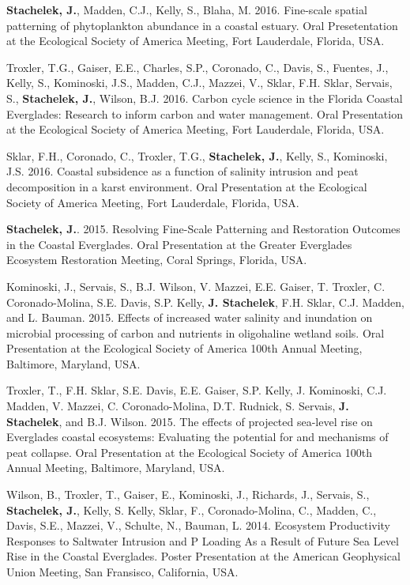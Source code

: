 \documentclass[11pt]{article}
\begin{document}
\begin{bibenum}
  \item \textbf{Stachelek, J.}, Madden, C.J., Kelly, S., Blaha, M. 2016. Fine-scale spatial patterning of phytoplankton abundance in a coastal estuary. Oral Presetentation at the Ecological Society of America Meeting, Fort Lauderdale, Florida, USA. %
% 
    \item Troxler, T.G., Gaiser, E.E., Charles, S.P., Coronado, C., Davis, S., Fuentes, J., Kelly, S., Kominoski, J.S., Madden, C.J., Mazzei, V., Sklar, F.H. Sklar, Servais, S., \textbf{Stachelek, J.}, Wilson, B.J. 2016. Carbon cycle science in the Florida Coastal Everglades: Research to inform carbon and water management. Oral Presentation at the Ecological Society of America Meeting, Fort Lauderdale, Florida, USA.
%   
    \item Sklar, F.H., Coronado, C., Troxler, T.G., \textbf{Stachelek, J.}, Kelly, S., Kominoski, J.S. 2016. Coastal subsidence as a function of salinity intrusion and peat decomposition in a karst environment. Oral Presentation at the Ecological Society of America Meeting, Fort Lauderdale, Florida, USA.
%   
    \item \textbf{Stachelek, J.}. 2015. Resolving Fine-Scale Patterning and Restoration Outcomes in the Coastal Everglades. Oral Presentation at the Greater Everglades Ecosystem Restoration Meeting, Coral Springs, Florida, USA. %
%   
    \item Kominoski, J., Servais, S., B.J. Wilson, V. Mazzei, E.E. Gaiser, T. Troxler, C. Coronado-Molina, S.E. Davis, S.P. Kelly, \textbf{J. Stachelek}, F.H. Sklar, C.J. Madden, and L. Bauman. 2015. Effects of increased water salinity and inundation on microbial processing of carbon and nutrients in oligohaline wetland soils. Oral Presentation at the Ecological Society of America 100th Annual Meeting, Baltimore, Maryland, USA.
%   
    \item Troxler, T., F.H. Sklar, S.E. Davis, E.E. Gaiser, S.P. Kelly, J. Kominoski, C.J. Madden, V. Mazzei, C. Coronado-Molina, D.T. Rudnick, S. Servais, \textbf{J. Stachelek}, and B.J. Wilson. 2015. The effects of projected sea-level rise on Everglades coastal ecosystems: Evaluating the potential for and mechanisms of peat collapse. Oral Presentation at the Ecological Society of America 100th Annual Meeting, Baltimore, Maryland, USA. 
%   
    \item Wilson, B., Troxler, T., Gaiser, E., Kominoski, J., Richards, J., Servais, S., \textbf{Stachelek, J.}, Kelly, S. Kelly, Sklar, F., Coronado-Molina, C., Madden, C., Davis, S.E., Mazzei, V., Schulte, N., Bauman, L. 2014. Ecosystem Productivity Responses to Saltwater Intrusion and P Loading As a Result of Future Sea Level Rise in the Coastal Everglades. Poster Presentation at the American Geophysical Union Meeting, San Fransisco, California, USA.
   

\end{bibenum}
\end{document}
